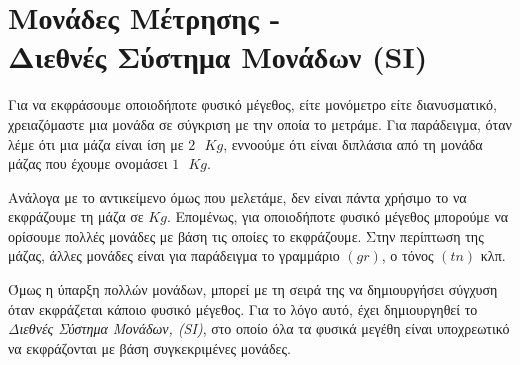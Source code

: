 \section{Μονάδες Μέτρησης -\\ Διεθνές Σύστημα Μονάδων (SI)}

Για να εκφράσουμε οποιοδήποτε φυσικό μέγεθος, είτε μονόμετρο είτε διανυσματικό, χρειαζόμαστε μια μονάδα σε σύγκριση με την οποία το μετράμε. Για παράδειγμα, όταν λέμε ότι μια μάζα είναι ίση με $2 \text{ }Kg$, εννοούμε ότι είναι διπλάσια από τη μονάδα μάζας που έχουμε ονομάσει $1 \text{ }Kg$.

Ανάλογα με το αντικείμενο όμως που μελετάμε, δεν είναι πάντα χρήσιμο το να εκφράζουμε τη μάζα σε $Kg$. Επομένως, για οποιοδήποτε φυσικό μέγεθος μπορούμε να ορίσουμε πολλές μονάδες με βάση τις οποίες το εκφράζουμε. Στην περίπτωση της μάζας, άλλες μονάδες είναι για παράδειγμα το γραμμάριο $(gr)$, ο τόνος $(tn)$ κλπ.

Όμως η ύπαρξη πολλών μονάδων, μπορεί με τη σειρά της να δημιουργήσει σύγχυση όταν εκφράζεται κάποιο φυσικό μέγεθος. Για το λόγο αυτό, έχει δημιουργηθεί το \textit{Διεθνές Σύστημα Μονάδων, (SI)}, στο οποίο όλα τα φυσικά μεγέθη είναι υποχρεωτικό να εκφράζονται με βάση συγκεκριμένες μονάδες.


